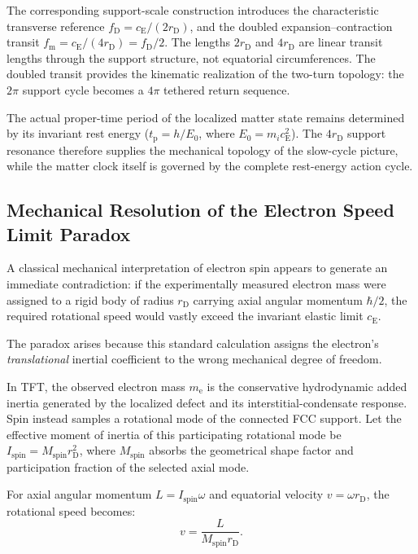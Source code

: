 The corresponding support-scale construction introduces the characteristic transverse reference $f_{\mathrm D} = c_{\mathrm E}/(2r_{\mathrm D})$, and the doubled expansion--contraction transit $f_{\mathrm m} = c_{\mathrm E}/(4r_{\mathrm D}) = f_{\mathrm D}/2$. The lengths $2r_{\mathrm D}$ and $4r_{\mathrm D}$ are linear transit lengths through the support structure, not equatorial circumferences. The doubled transit provides the kinematic realization of the two-turn topology: the $2\pi$ support cycle becomes a $4\pi$ tethered return sequence.

The actual proper-time period of the localized matter state remains determined by its invariant rest energy ($t_{\mathrm p} = h/E_0$, where $E_0 = m_i c_{\mathrm E}^{2}$). The $4r_{\mathrm D}$ support resonance therefore supplies the mechanical topology of the slow-cycle picture, while the matter clock itself is governed by the complete rest-energy action cycle.

\subsection{Mechanical Resolution of the Electron Speed Limit Paradox}

A classical mechanical interpretation of electron spin appears to generate an immediate contradiction: if the experimentally measured electron mass were assigned to a rigid body of radius $r_{\mathrm D}$ carrying axial angular momentum $\hbar/2$, the required rotational speed would vastly exceed the invariant elastic limit $c_{\mathrm E}$.

The paradox arises because this standard calculation assigns the electron's \emph{translational} inertial coefficient to the wrong mechanical degree of freedom. 

In TFT, the observed electron mass $m_{\mathrm e}$ is the conservative hydrodynamic added inertia generated by the localized defect and its interstitial-condensate response. Spin instead samples a rotational mode of the connected FCC support. Let the effective moment of inertia of this participating rotational mode be $I_{\mathrm{spin}} = M_{\mathrm{spin}}r_{\mathrm D}^{2}$, where $M_{\mathrm{spin}}$ absorbs the geometrical shape factor and participation fraction of the selected axial mode.

For axial angular momentum $L = I_{\mathrm{spin}}\omega$ and equatorial velocity $v = \omega r_{\mathrm D}$, the rotational speed becomes:
\begin{equation}
    v = \frac{L}{M_{\mathrm{spin}}r_{\mathrm D}}.
\end{equation}

